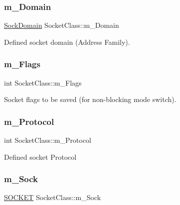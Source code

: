 \subsubsection{\texorpdfstring{m\+\_\+\+Domain}{m\_Domain}}
{\footnotesize\ttfamily \hyperlink{classSocketClass_ac940413abaa7328db8518a9f121babb6}{Sock\+Domain} Socket\+Class\+::m\+\_\+\+Domain\hspace{0.3cm}{\ttfamily [protected]}}



Defined socket domain (Address Family). 

\mbox{\label{classSocketClass_aba4d44a061616e2f56d2797418af510c}} 
\subsubsection{\texorpdfstring{m\+\_\+\+Flags}{m\_Flags}}
{\footnotesize\ttfamily int Socket\+Class\+::m\+\_\+\+Flags\hspace{0.3cm}{\ttfamily [protected]}}



Socket flags to be saved (for non-\/blocking mode switch). 

\mbox{\label{classSocketClass_ac22407bcd7ecf8b439d7f3b543e9db38}} 
\subsubsection{\texorpdfstring{m\+\_\+\+Protocol}{m\_Protocol}}
{\footnotesize\ttfamily int Socket\+Class\+::m\+\_\+\+Protocol\hspace{0.3cm}{\ttfamily [protected]}}

Defined socket Protocol \mbox{\label{classSocketClass_a77d848dafefa82afa5defbf2d82f7290}} 
\subsubsection{\texorpdfstring{m\+\_\+\+Sock}{m\_Sock}}
{\footnotesize\ttfamily \hyperlink{sockclasslib_8h_a8dc8083897335125630f1af5dafd5831}{S\+O\+C\+K\+ET} Socket\+Class\+::m\+\_\+\+Sock\hspace{0.3cm}{\ttfamily [protected]}}



